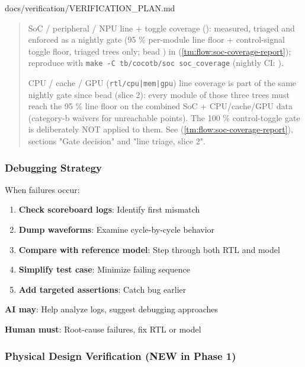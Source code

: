 \begin{relocated}{docs/verification/VERIFICATION_PLAN.md}
\begin{quote}
SoC / peripheral / NPU line + toggle coverage (): measured,
triaged and enforced as a nightly gate (95 \% per-module line floor +
control-signal toggle floor, triaged trees only; bead ) in
 (\cref{tm:flow:soc-coverage-report}); reproduce with
\texttt{make\ -\allowbreak{}C\ tb/\allowbreak{}cocotb/\allowbreak{}soc\ soc\_\allowbreak{}coverage}
(nightly CI: ).

CPU / cache / GPU (\texttt{rtl/\allowbreak{}cpu|mem|gpu}) line coverage
is part of the same nightly gate since bead  (slice 2): every
module of those three trees must reach the 95 \% line floor on the
combined SoC + CPU/\allowbreak{}cache/\allowbreak{}GPU data (category-b
waivers for unreachable points). The 100 \% control-toggle gate is
deliberately NOT applied to them. See
 (\cref{tm:flow:soc-coverage-report}), sections "Gate decision"
and "line triage, slice 2".
\end{quote}

\subsubsection{Debugging Strategy}\label{ds:ch:verification-plan:debugging-strategy}

When failures occur:

\begin{enumerate}
\def\labelenumi{\arabic{enumi}.}
\tightlist
\item
  \textbf{Check scoreboard logs}: Identify first mismatch
\item
  \textbf{Dump waveforms}: Examine cycle-by-cycle behavior
\item
  \textbf{Compare with reference model}: Step through both RTL and model
\item
  \textbf{Simplify test case}: Minimize failing sequence
\item
  \textbf{Add targeted assertions}: Catch bug earlier
\end{enumerate}

\textbf{AI may}: Help analyze logs, suggest debugging approaches

\textbf{Human must}: Root-cause failures, fix RTL or model

\subsubsection{Physical Design Verification (NEW in Phase 1)}\label{ds:ch:verification-plan:physical-design-verification-new-in-phase-1}


\end{relocated}
